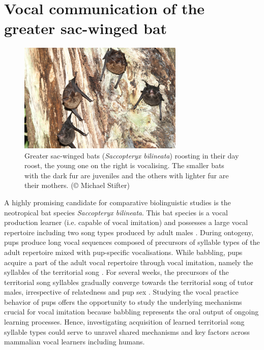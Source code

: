\section{Vocal communication of the greater sac-winged bat}
\begin{figure}[H]
\centering
  \includegraphics[width=0.7\textwidth]{image/Sacco Dayroost.jpg}
  \caption{Greater sac-winged bats (\emph{Saccopteryx bilineata}) roosting in their day roost, the young one on the right is vocalising. The smaller bats with the dark fur are juveniles and the others with lighter fur are their mothers. (© Michael Stifter)}
  \label{fig:sacco}
\end{figure}

A highly promising candidate for comparative biolinguistic studies is the neotropical bat species \emph{Saccopteryx bilineata}.
This bat species is a vocal production learner (i.e. capable of vocal imitation) \cite{Knornschild2010} and possesses a large vocal repertoire including two song types produced by adult males \cite{Knornschild2006}. During ontogeny, pups produce long vocal sequences composed of precursors of syllable types of the adult repertoire mixed with pup-specific vocalisations. While babbling, pups acquire a part of the adult vocal repertoire through vocal imitation, namely the syllables of the territorial song \cite{Knornschild2006}. For several weeks, the precursors of the territorial song syllables gradually converge towards the territorial song of tutor males, irrespective of relatedness and pup sex \cite{Knornschild2010}.
Studying the vocal practice behavior of pups offers the opportunity to study the underlying mechanisms crucial for vocal imitation because babbling represents the oral output of ongoing learning processes. Hence, investigating acquisition of learned territorial song syllable types could serve to unravel shared mechanisms and key factors across mammalian vocal learners including humans.


